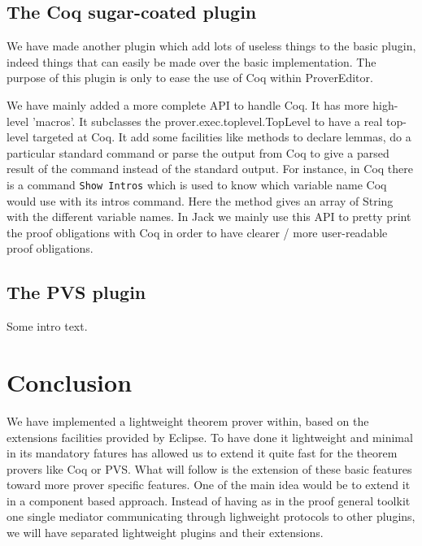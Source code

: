 \documentclass{entcs}
\begin{document}
\subsection{The Coq sugar-coated plugin}
\label{subsec:coq-sugar-coated}

We have made another plugin which add lots of useless things to the 
basic plugin,
indeed things that can easily be made over the basic implementation.
The purpose of this plugin is only to ease the use of Coq within ProverEditor.

We have mainly added a more complete API to handle Coq. 
It has more high-level 'macros'. 
It subclasses the prover.exec.toplevel.TopLevel to have a real top-level
targeted at Coq. It add some facilities like methods to declare lemmas, 
do a particular standard command or parse the output from Coq to give 
a parsed result of the command instead of the standard output. 
For instance, in Coq there is a command {\tt Show Intros} which
is used to know which variable name Coq would use with its  intros command. 
Here the method gives an array of String with the different variable names.
In Jack we mainly use this API to pretty print the proof obligations with 
Coq in order to have clearer / more user-readable proof obligations.

\subsection{The PVS plugin}
\label{subsec:pvs-plugin}

Some intro text. %

\section{Conclusion}
\label{sec:conclusion}

We have implemented a lightweight theorem prover within, 
based on the extensions facilities provided by Eclipse. 
To have done it lightweight and minimal in its mandatory
fatures has allowed us to extend it quite fast for the theorem 
provers like Coq or PVS.
What will follow is the extension of these basic features toward more prover 
specific features.
One of the main idea would be to extend it in a component based approach.
Instead of having as in the proof general toolkit one single 
mediator communicating through lighweight protocols to other plugins, 
we will have separated lightweight plugins and their extensions.
\end{document}
